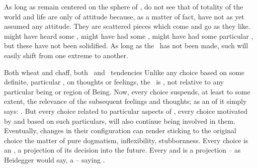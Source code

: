 {  As long as  remain centered on the sphere of ,  do
  not see that  of totality of the world and life are only
   of  attitude because, as a matter of fact,  have
  not as yet assumed any attitude.  They are scattered pieces which come and go
  as they like.   might have heard some  , might have
  had some , might have had some particular
  , but these have not been solidified.  As long as the \sch\ has
  not been made, such  will easily shift from one extreme to
  another.  
%
} %


\pa Both wheat and chaff, both \yes\ and \No\ tendencies  Unlike any choice
based on some definite, particular , on thoughts or feelings,
the \sch\ is , not relative to any particular being or region of
Being.  Now, every choice suspends, at least to some extent, the relevance of
the subsequent feelings and thoughts; as an  of  it simply
says: . But every choice related to
particular aspects of , every choice motivated by and based on
such particulars, will also continue being involved in them.  Eventually,
changes in their configuration can render sticking to the original choice the
matter of pure dogmatism, inflexibility, stubbornness. Every  choice
is an , a projection of its  decision into the
future. Every  and  is a projection -- as Heidegger would
say, a  -- saying .

